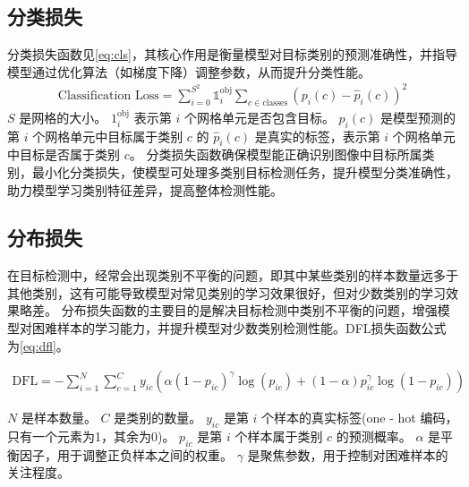 \subsection{分类损失}
分类损失函数见\ref{eq:cls}，其核心作用是衡量模型对目标类别的预测准确性，并指导模型通过优化算法（如梯度下降）调整参数，从而提升分类性能。
\begin{equation}
  \begin{aligned}
    \text{Classification Loss} = \sum_{i = 0}^{S^2} \mathbb{1}_{i}^{\text{obj}} \sum_{c \in \text{classes}} (p_i(c) - \hat{p}_i(c))^2 \label{eq:cls}
  \end{aligned}
\end{equation}
$S$ 是网格的大小。
$1_{i}^{\text{obj}}$ 表示第 $i$ 个网格单元是否包含目标。
$p_i(c)$ 是模型预测的第 $i$ 个网格单元中目标属于类别 $c$ 的
$\hat{p}_i(c)$ 是真实的标签，表示第 $i$ 个网格单元中目标是否属于类别 $c$。
分类损失函数确保模型能正确识别图像中目标所属类别，最小化分类损失，使模型可处理多类别目标检测任务，提升模型分类准确性，助力模型学习类别特征差异，提高整体检测性能。


\subsection{分布损失}
在目标检测中，经常会出现类别不平衡的问题，即其中某些类别的样本数量远多于其他类别，这有可能导致模型对常见类别的学习效果很好，但对少数类别的学习效果略差。
分布损失函数的主要目的是解决目标检测中类别不平衡的问题，增强模型对困难样本的学习能力，并提升模型对少数类别检测性能。DFL损失函数公式为\ref{eq:dfl}。

\begin{equation}
  \begin{aligned}
    \text{DFL} = - \sum_{i = 1}^{N} \sum_{c = 1}^{C} y_{ic} \left( \alpha (1 - p_{ic})^{\gamma} \log(p_{ic}) + (1 - \alpha) p_{ic}^{\gamma} \log(1 - p_{ic}) \right) \label{eq:dfl}
  \end{aligned}
\end{equation}

$N$ 是样本数量。
$C$ 是类别的数量。
$y_{ic}$ 是第 $i$ 个样本的真实标签(one - hot 编码，只有一个元素为1，其余为0)。
$p_{ic}$ 是第 $i$ 个样本属于类别 $c$ 的预测概率。
$\alpha$ 是平衡因子，用于调整正负样本之间的权重。
$\gamma$ 是聚焦参数，用于控制对困难样本的关注程度。


